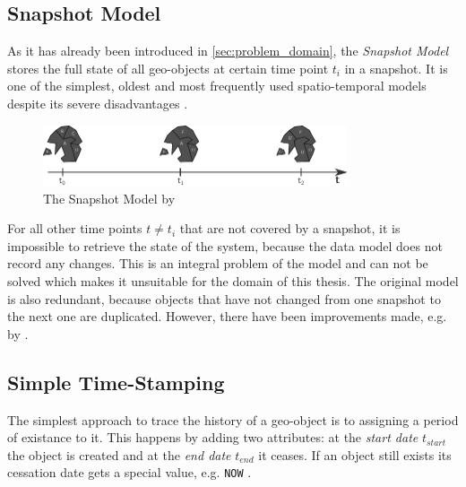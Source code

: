 \subsection{Snapshot Model} %
\label{sub:snapshot_model}

As it has already been introduced in \ref{sec:problem_domain}, the \emph{Snapshot Model} stores the full state of all geo-objects at certain time point $t_i$ in a snapshot. It is one of the simplest, oldest and most frequently used spatio-temporal models despite its severe disadvantages
\cite{Langran1988frameworktgis}.

\begin{figure}[H]
  \vspace{1em}
  \centering
  \includegraphics[width=0.8\textwidth]{graphics/basics/stdm/snapshot_model}
  \caption{The Snapshot Model by \cite{Langran1988frameworktgis}}
  \label{fig:snapshot_model}
\end{figure}

For all other time points $t \neq t_i$ that are not covered by a snapshot, it is impossible to retrieve the state of the system, because the data model does not record any changes. This is an integral problem of the model and can not be solved which makes it unsuitable for the domain of this thesis. The original model is also redundant, because objects that have not changed from one snapshot to the next one are duplicated. However, there have been improvements made, e.g. by \cite{armenakis92}.


\subsection{Simple Time-Stamping} %
\label{sub:simple_time_stamping}

The simplest approach to trace the history of a geo-object is to assigning a period of existance to it. This happens by adding two attributes: at the \emph{start date} $t_{start}$ the object is created and at the \emph{end date} $t_{end}$ it ceases. If an object still exists its cessation date gets a special value, e.g. \texttt{NOW}
\cite{hunter90timestamping}.

